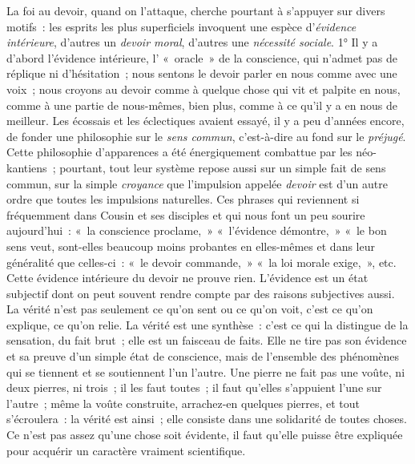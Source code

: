\documentclass[french,twoside]{book} %
\begin{document}
La foi au devoir, quand on l’attaque, cherche pourtant à s’appuyer sur divers motifs : les esprits les plus superficiels invoquent une espèce d’\emph{évidence intérieure}, d’autres un \emph{devoir moral}, d’autres une \emph{nécessité sociale}. 1° Il y a d’abord l’évidence intérieure, l’ « oracle » de la conscience, qui n’admet pas de réplique ni d’hésitation ; nous sentons le devoir parler en nous comme avec une voix ; nous croyons au devoir comme à quelque chose qui vit et palpite en nous, comme à une partie de nous-mêmes, bien plus, comme à ce qu’il y a en nous de meilleur. Les écossais et les éclectiques avaient essayé, il y a peu d’années encore, de fonder une philosophie sur le \emph{sens commun}, c’est-à-dire au fond sur le \emph{préjugé}. Cette philosophie d’apparences a été énergiquement combattue par les néo-kantiens ; pourtant, tout leur système repose aussi sur un simple fait de sens commun, sur la simple \emph{croyance} que l’impulsion appelée \emph{devoir} est d’un autre ordre que toutes les impulsions naturelles. Ces phrases qui reviennent si fréquemment dans Cousin et ses disciples et qui nous font un peu sourire aujourd’hui : « la conscience proclame, » « l’évidence démontre, » « le bon sens veut, sont-elles beaucoup moins probantes en elles-mêmes et dans leur généralité que celles-ci : « le devoir commande, » « la loi morale exige, », etc. Cette évidence intérieure du devoir ne prouve rien. L’évidence est un état subjectif dont on peut souvent rendre compte par des raisons subjectives aussi. La vérité n’est pas seulement ce qu’on sent ou ce qu’on voit, c’est ce qu’on explique, ce qu’on relie. La vérité est une synthèse : c’est ce qui la distingue de la sensation, du fait brut ; elle est un faisceau de faits. Elle ne tire pas son évidence et sa preuve d’un simple état de conscience, mais de l’ensemble des phénomènes qui se tiennent et se soutiennent l’un l’autre. Une pierre ne fait pas une voûte, ni deux pierres, ni trois ; il les faut toutes ; il faut qu’elles s’appuient l’une sur l’autre ; même la voûte construite, arrachez-en quelques pierres, et tout s’écroulera : la vérité est ainsi ; elle consiste dans une solidarité de toutes choses. Ce n’est pas assez qu’une chose soit évidente, il faut qu’elle puisse être expliquée pour acquérir un caractère vraiment scientifique.\par
\end{document}
